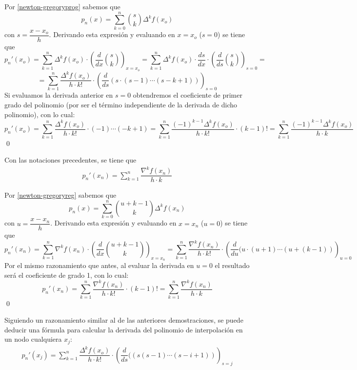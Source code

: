             \begin{dem}
            Por \ref{newton-gregoryprog} sabemos que
            $$p_n(x)=\sum_{k=0}^n\binom{s}{k}\Delta^k f(x_o)$$
            con $s=\dfrac{x-x_o}{h}$. Derivando esta expresión y evaluando en $x=x_o$ ($s=0$) se tiene que
            $$p_n'(x_o)=\sum_{k=1}^n\Delta^kf(x_o) \cdot \left(\dfrac{d}{dx}\binom{s}{k}\right)_{x=x_o}=\sum_{k=1}^n\Delta^kf(x_o) \cdot \dfrac{ds}{dx} \cdot\left(\dfrac{d}{ds}\binom{s}{k}\right)_{s=0}=$$
            $$=\sum_{k=1}^n\dfrac{\Delta^kf(x_o)}{h\cdot k!} \cdot \left(\dfrac{d}{ds}(s\cdot (s-1)\cdots (s-k+1))\right)_{s=0}$$
             Si evaluamos la derivada anterior en $s=0$ obtendremos el coeficiente de primer grado del polinomio (por ser el término independiente de la derivada de dicho polinomio), con lo cual:
            $$p_n'(x_o)=\sum_{k=1}^n\dfrac{\Delta^kf(x_o)}{h\cdot k!} \cdot (-1)\cdots (-k+1)=\sum_{k=1}^n\dfrac{(-1)^{k-1}\Delta^kf(x_o)}{h\cdot k!} \cdot (k-1)!=\sum_{k=1}^n\dfrac{(-1)^{k-1}\Delta^k f(x_o)}{h\cdot k}$$
            \qed\end{dem}
            \begin{prop}
            Con las notaciones precedentes, se tiene que
            \begin{align}
            p_n'(x_n)=\sum_{k=1}^n\dfrac{\nabla^k f(x_n)}{h\cdot k}
            \label{derivada:reg}
            \end{align}
            \end{prop}
            \begin{dem}
            Por \ref{newton-gregoryreg} sabemos que
            $$p_n(x)=\sum_{k=0}^n\binom{u+k-1}{k}\Delta^k f(x_n)$$
            con $u=\dfrac{x-x_n}{h}$. Derivando esta expresión y evaluando en $x=x_n$ ($u=0$) se tiene que
            $$p_n'(x_n)=\sum_{k=1}^n \nabla^kf(x_n)\cdot \left(\dfrac{d}{dx}\binom{u+k-1}{k}\right)_{x=x_n}=\sum_{k=1}^n \dfrac{\nabla^kf(x_n)}{h\cdot k!}\cdot \left(\dfrac{d}{du}(u\cdot (u+1)\cdots(u+(k-1))\right)_{u=0}$$
            Por el mismo razonamiento que antes, al evaluar la derivada en $u=0$ el resultado será el coeficiente de grado 1, con lo cual:
            $$p_n'(x_n)=\sum_{k=1}^n \dfrac{\nabla^kf(x_n)}{h\cdot k!}\cdot (k-1)!=\sum_{k=1}^n\dfrac{\nabla^k f(x_n)}{h\cdot k}$$
            \qed\end{dem}
            \begin{obs}
            Siguiendo un razonamiento similar al de las anteriores demostraciones, se puede deducir una fórmula para calcular la derivada del polinomio de interpolación en un nodo cualquiera $x_j$:
            \begin{align}
            p_n'(x_j)=\sum_{k=1}^n\dfrac{\Delta^k f(x_o)}{h\cdot k!}\cdot \left(\dfrac{d}{ds}((s(s-1)\cdots(s-i+1))\right)_{s=j}                     \label{derivada:cent}    
            \end{align}
            \end{obs}
            
